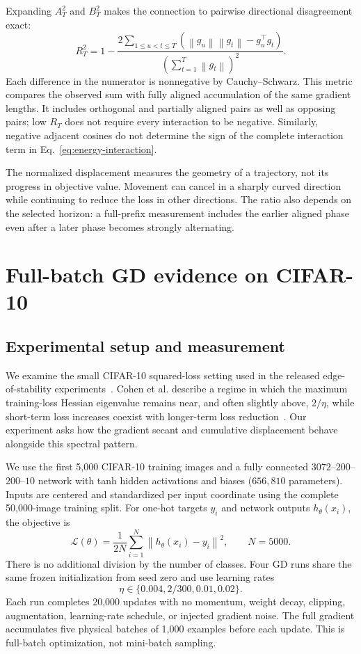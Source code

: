 \documentclass[11pt]{article}
\newcommand{\norm}[1]{\left\lVert#1\right\rVert}
\newcommand{\Loss}{\mathcal{L}}
\begin{document}
Expanding $A_T^2$ and $B_T^2$ makes the connection to pairwise directional
disagreement exact:
\begin{equation}
 R_T^2=1-\frac{2\sum_{1\leq u<t\leq T}
        (\norm{g_u}\norm{g_t}-g_u^\top g_t)}
       {\left(\sum_{t=1}^T\norm{g_t}\right)^2}.
 \label{eq:interference-gap}
\end{equation}
Each difference in the numerator is nonnegative by Cauchy--Schwarz. This metric
compares the observed sum with fully aligned accumulation of the same gradient
lengths. It includes orthogonal and partially aligned pairs as well as opposing
pairs; low $R_T$ does not require every interaction to be negative. Similarly,
negative adjacent cosines do not determine the sign of the complete interaction
term in Eq.~\eqref{eq:energy-interaction}.

The normalized displacement measures the geometry of a trajectory, not its
progress in objective value. Movement can cancel in a sharply curved direction
while continuing to reduce the loss in other directions. The ratio also depends
on the selected horizon: a full-prefix measurement includes the earlier aligned
phase even after a later phase becomes strongly alternating.

\section{Full-batch GD evidence on CIFAR-10}

\subsection{Experimental setup and measurement}

We examine the small CIFAR-10 squared-loss setting used in the released
edge-of-stability experiments~\cite{cohen2021,eoscode}. Cohen et al. describe
a regime in which the maximum training-loss Hessian eigenvalue remains near,
and often slightly above, $2/\eta$, while short-term loss increases coexist
with longer-term loss reduction~\cite{cohen2021}. Our experiment asks how the
gradient secant and cumulative displacement behave alongside this spectral
pattern.

We use the first 5,000 CIFAR-10 training images and a fully connected
$3072$--$200$--$200$--$10$ network with tanh hidden activations and biases
($656{,}810$ parameters). Inputs are centered and standardized per input
coordinate using the complete 50,000-image training split. For one-hot targets
$y_i$ and network outputs $h_\theta(x_i)$, the objective is
\begin{equation}
  \Loss(\theta)=\frac{1}{2N}\sum_{i=1}^N
                   \norm{h_\theta(x_i)-y_i}^2,
  \qquad N=5000.
\end{equation}
There is no additional division by the number of classes. Four GD runs share
the same frozen initialization from seed zero and use learning rates
\[
  \eta\in\{0.004,2/300,0.01,0.02\}.
\]
Each run completes 20,000 updates with no momentum, weight decay,
clipping, augmentation, learning-rate schedule, or injected gradient noise.
The full gradient accumulates five physical batches of 1,000 examples before
each update. This is full-batch optimization, not mini-batch sampling.
\end{document}
